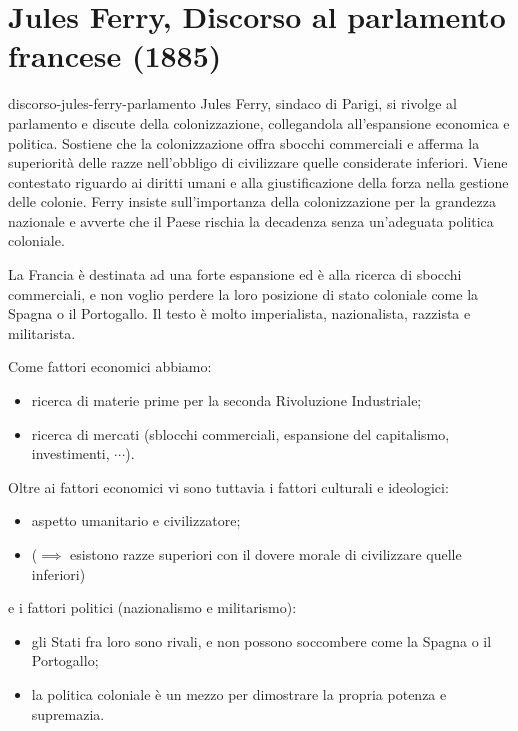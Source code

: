 \documentclass[preview]{standalone}
\begin{document}
\section{Jules Ferry, Discorso al parlamento francese (1885)}

\begin{snippet}{discorso-jules-ferry-parlamento}
    Jules Ferry, sindaco di Parigi, si rivolge al parlamento e
    discute della colonizzazione, collegandola all'espansione economica e politica.
    Sostiene che la colonizzazione offra sbocchi commerciali e afferma la superiorità delle razze
    nell'obbligo di civilizzare quelle considerate inferiori.
    Viene contestato riguardo ai diritti umani e alla giustificazione della forza nella
    gestione delle colonie.
    Ferry insiste sull'importanza della colonizzazione per la grandezza nazionale e
    avverte che il Paese rischia la decadenza senza un'adeguata politica coloniale.
    
    La Francia è destinata ad una forte espansione ed è alla ricerca di sbocchi commerciali,
    e non voglio perdere la loro posizione di stato coloniale come la Spagna o il Portogallo.
    Il testo è molto imperialista, nazionalista, razzista e militarista.
    
    Come fattori economici abbiamo:
    \begin{itemize}
        \item ricerca di materie prime per la seconda Rivoluzione Industriale;
        \item ricerca di mercati (sblocchi commerciali, espansione del capitalismo, investimenti, \(\cdots\)).
    \end{itemize}
    Oltre ai fattori economici vi sono tuttavia i fattori culturali e ideologici:
    \begin{itemize}
        \item aspetto umanitario e civilizzatore;
        \item (\(\implies\) esistono razze superiori con il dovere morale di civilizzare quelle inferiori)
    \end{itemize}
    e i fattori politici (nazionalismo e militarismo):
    \begin{itemize}
        \item gli Stati fra loro sono rivali, e non possono soccombere come la Spagna o il Portogallo;
        \item la politica coloniale è un mezzo per dimostrare la propria potenza e supremazia.
    \end{itemize}
\end{snippet}
\end{document}
